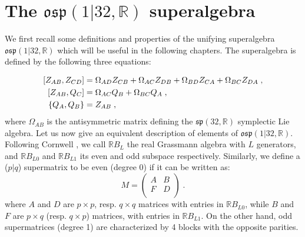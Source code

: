 \documentclass[a4paper,11pt]{article}
\begin{document}
\section{The $\mathfrak{osp}(1|32,\mathbb{R})$ superalgebra}
We first recall some definitions and properties of the unifying superalgebra $\mathfrak{osp}(1|32,\mathbb{R})$ 
which will be useful in the following chapters. The superalgebra is defined by the following three equations:  

\begin{align}\label{alg}
[Z_{AB},Z_{CD}] & = \Omega_{AD} Z_{CB} +  \Omega_{AC} Z_{DB} +  \Omega_{BD} Z_{CA} + \Omega_{BC} Z_{DA} \;, \notag\\
[Z_{AB},Q_C] & = \Omega_{AC} Q_B + \Omega_{BC} Q_A \;,\\
\{Q_A,Q_B\} & = Z_{AB}\;, \notag
\end{align}
where $\Omega_{AB}$ is the antisymmetric matrix defining the $\mathfrak{sp}(32,\mathbb{R})$ symplectic Lie algebra. 
Let us now give an equivalent description of elements of $\mathfrak{osp}(1|32,\mathbb{R})$. Following  Cornwell 
\cite{GTP3}, we call $\mathbb{R}B_L$ the real Grassmann algebra with 
$L$ generators, and $\mathbb{R}B_{L0}$ and $\mathbb{R}B_{L1}$ its even and odd subspace respectively. 
Similarly, we define a ($p|q$) supermatrix to be even (degree $0$) if it can be written as:
$$
M=\begin{pmatrix}
A & B\\
F & D\\
\end{pmatrix}\;.
$$
where $A$ and $D$ are $p \times p$, resp. $q \times q$  matrices with entries in $\mathbb{R}B_{L0}$, while $B$ and $F$ are 
$p \times q$ (resp. $q \times p$) matrices, with entries in $\mathbb{R}B_{L1}$. On the other hand, odd supermatrices 
(degree 1) are characterized by 4 blocks with the opposite parities.
\end{document}
